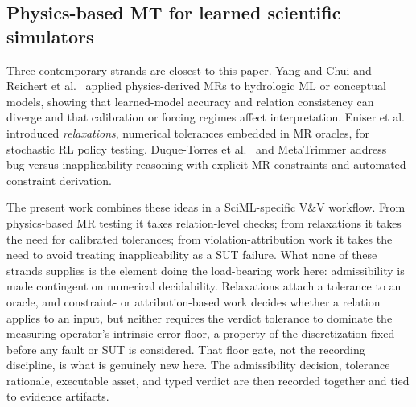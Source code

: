 \documentclass[preprint,12pt]{elsarticle}
\begin{document}
\subsection{Physics-based MT for learned scientific simulators}
\label{subsec:physics-mt}

Three contemporary strands are closest to this paper. Yang and Chui \citep{yang2021hydromt} and Reichert et al.~\citep{reichert2024hess} applied physics-derived MRs to hydrologic ML or conceptual models, showing that learned-model accuracy and relation consistency can diverge and that calibration or forcing regimes affect interpretation. Eniser et al.~\citep{eniser2022relaxations} introduced \emph{relaxations}, numerical tolerances embedded in MR oracles, for stochastic RL policy testing. Duque-Torres et al.~\citep{duqueTorres2023bugornot,duqueTorres2023completePipeline,duqueTorres2024selecting} and MetaTrimmer \citep{duqueTorres2023metaTrimmer} address bug-versus-inapplicability reasoning with explicit MR constraints and automated constraint derivation.

The present work combines these ideas in a SciML-specific V\&V workflow. From physics-based MR testing it takes relation-level checks; from relaxations it takes the need for calibrated tolerances; from violation-attribution work it takes the need to avoid treating inapplicability as a SUT failure. What none of these strands supplies is the element doing the load-bearing work here: admissibility is made contingent on numerical decidability. Relaxations attach a tolerance to an oracle, and constraint- or attribution-based work decides whether a relation applies to an input, but neither requires the verdict tolerance to dominate the measuring operator's intrinsic error floor, a property of the discretization fixed before any fault or SUT is considered. That floor gate, not the recording discipline, is what is genuinely new here. The admissibility decision, tolerance rationale, executable asset, and typed verdict are then recorded together and tied to evidence artifacts.
\end{document}

